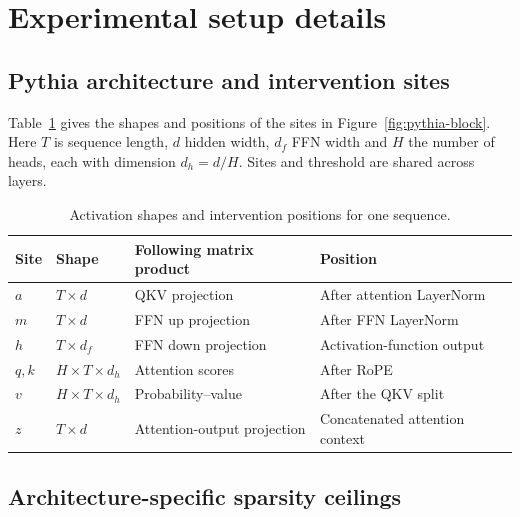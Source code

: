\section{Experimental setup details}
\label{app:experiment}

\subsection{Pythia architecture and intervention sites}
\label{app:sites}

Table~\ref{tab:sites} gives the shapes and positions of the sites in
Figure~\ref{fig:pythia-block}. Here $T$ is sequence length, $d$ hidden width,
$d_f$ FFN width and $H$ the number of heads, each with dimension $d_h=d/H$.
Sites and threshold are shared across layers.

\begin{table}[ht]
\centering\small
\caption{Activation shapes and intervention positions for one sequence.}
\label{tab:sites}
\vspace{4pt}
\begin{tabularx}{\linewidth}{@{}lllX@{}}
\toprule
Site & Shape & Following matrix product & Position \\
\midrule
$a$ & $T\!\times\!d$ & QKV projection & After attention LayerNorm \\
$m$ & $T\!\times\!d$ & FFN up projection & After FFN LayerNorm \\
$h$ & $T\!\times\!d_f$ & FFN down projection & Activation-function output \\
$q,k$ & $H\!\times\!T\!\times\!d_h$ & Attention scores & After RoPE \\
$v$ & $H\!\times\!T\!\times\!d_h$ & Probability--value & After the QKV split \\
$z$ & $T\!\times\!d$ & Attention-output projection & Concatenated attention context \\
\bottomrule
\end{tabularx}
\end{table}

\FloatBarrier
\subsection{Architecture-specific sparsity ceilings}
\label{app:architecture-counts}

